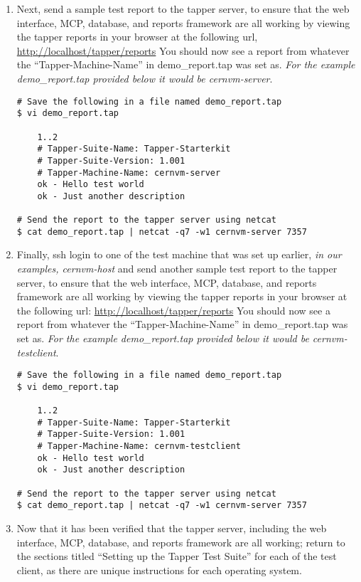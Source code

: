 \begin{enumerate}
\item 	Next, send a sample test report to the tapper server, to ensure that the web interface, MCP, database, and reports
		framework are all working by viewing the tapper reports in your browser at the following url, 
		\url{http://localhost/tapper/reports} You should now see a report from whatever the ``Tapper-Machine-Name'' in 
		demo\_report.tap was set as. \emph{For the example demo\_report.tap provided below it would be cernvm-server}.
\lstset{caption= Send a Report from the \tapper~Server to Itself}
\begin{lstlisting}
# Save the following in a file named demo_report.tap
$ vi demo_report.tap

	1..2
	# Tapper-Suite-Name: Tapper-Starterkit
	# Tapper-Suite-Version: 1.001
	# Tapper-Machine-Name: cernvm-server
	ok - Hello test world
	ok - Just another description

# Send the report to the tapper server using netcat
$ cat demo_report.tap | netcat -q7 -w1 cernvm-server 7357
\end{lstlisting}

\item Finally, ssh login to one of the test machine that was set up earlier, \emph{in our examples, cernvm-host} and send another 
sample test report to the tapper server, to ensure that the web interface, MCP, database, and reports framework are all working by
viewing the tapper reports in your browser at the following url: \url{http://localhost/tapper/reports} 
You should now see a report from whatever the ``Tapper-Machine-Name'' in demo\_report.tap was set as. \emph{For the example 
demo\_report.tap provided below it would be cernvm-testclient}.
\lstset{caption= Send a Report to the \tapper~Server from a Test Client}
\begin{lstlisting}
# Save the following in a file named demo_report.tap
$ vi demo_report.tap

	1..2
	# Tapper-Suite-Name: Tapper-Starterkit
	# Tapper-Suite-Version: 1.001
	# Tapper-Machine-Name: cernvm-testclient
	ok - Hello test world
	ok - Just another description

# Send the report to the tapper server using netcat
$ cat demo_report.tap | netcat -q7 -w1 cernvm-server 7357
\end{lstlisting}

\item	Now that it has been verified that the tapper server, including the web interface, MCP, database, and reports framework 
		are all working; return to the sections titled ``Setting up the Tapper Test Suite''	for each of the test client, as 
		there are unique instructions for each operating system.
\end{enumerate}
